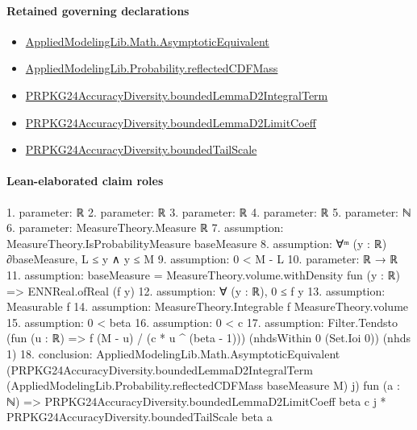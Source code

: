 \documentclass[10pt]{article}
\begin{document}
\paragraph{Retained governing declarations}
\begin{itemize}\raggedright
\item \hyperlink{governing-declaration-4f7a9039c890ef63}{Applied\allowbreak{}Modeling\allowbreak{}Lib.\allowbreak{}Math.\allowbreak{}Asymptotic\allowbreak{}Equivalent}
\item \hyperlink{governing-declaration-57e87ebcbc860ebd}{Applied\allowbreak{}Modeling\allowbreak{}Lib.\allowbreak{}Probability.\allowbreak{}reflected\allowbreak{}CDF\allowbreak{}Mass}
\item \hyperlink{governing-declaration-bb5fd31e354386d7}{PRPKG24\allowbreak{}Accuracy\allowbreak{}Diversity.\allowbreak{}bounded\allowbreak{}Lemma\allowbreak{}D2\allowbreak{}Integral\allowbreak{}Term}
\item \hyperlink{governing-declaration-0e195936b6402fb1}{PRPKG24\allowbreak{}Accuracy\allowbreak{}Diversity.\allowbreak{}bounded\allowbreak{}Lemma\allowbreak{}D2\allowbreak{}Limit\allowbreak{}Coeff}
\item \hyperlink{governing-declaration-3d6778643ef28d4a}{PRPKG24\allowbreak{}Accuracy\allowbreak{}Diversity.\allowbreak{}bounded\allowbreak{}Tail\allowbreak{}Scale}
\end{itemize}
\paragraph{Lean-elaborated claim roles}\begin{ReviewVerbatim}
1. parameter: ℝ
2. parameter: ℝ
3. parameter: ℝ
4. parameter: ℝ
5. parameter: ℕ
6. parameter: MeasureTheory.Measure ℝ
7. assumption: MeasureTheory.IsProbabilityMeasure baseMeasure
8. assumption: ∀ᵐ (y : ℝ) ∂baseMeasure, L ≤ y ∧ y ≤ M
9. assumption: 0 < M - L
10. parameter: ℝ → ℝ
11. assumption: baseMeasure = MeasureTheory.volume.withDensity fun (y : ℝ) => ENNReal.ofReal (f y)
12. assumption: ∀ (y : ℝ), 0 ≤ f y
13. assumption: Measurable f
14. assumption: MeasureTheory.Integrable f MeasureTheory.volume
15. assumption: 0 < beta
16. assumption: 0 < c
17. assumption: Filter.Tendsto (fun (u : ℝ) => f (M - u) / (c * u ^ (beta - 1))) (nhdsWithin 0 (Set.Ioi 0)) (nhds 1)
18. conclusion: AppliedModelingLib.Math.AsymptoticEquivalent
  (PRPKG24AccuracyDiversity.boundedLemmaD2IntegralTerm (AppliedModelingLib.Probability.reflectedCDFMass baseMeasure M)
    j)
  fun (a : ℕ) =>
  PRPKG24AccuracyDiversity.boundedLemmaD2LimitCoeff beta c j * PRPKG24AccuracyDiversity.boundedTailScale beta a
\end{ReviewVerbatim}
\end{document}
